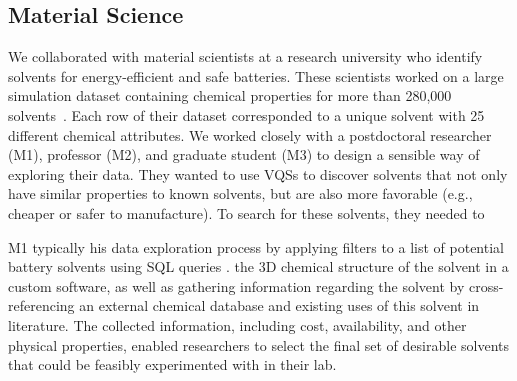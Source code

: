  \subsection{Material Science}
 \par\noindent{} 
 \npar We collaborated with material scientists at a research university who identify solvents for energy-efficient and safe batteries. These scientists worked on a large simulation dataset containing chemical properties for more than 280,000 solvents~\cite{Khetan2018}. Each row of their dataset corresponded to a unique solvent with 25 different chemical attributes. We worked closely with a postdoctoral researcher (M1), professor (M2), and graduate student (M3) to design a sensible way of exploring their data. They wanted to use VQSs to discover solvents that not only have similar properties to known solvents, but are also more favorable (e.g., cheaper or safer to manufacture). To search for these solvents, they needed to {\em{}}
 \par\noindent{} 
 \npar M1 typically  his data exploration process by applying filters to a list of potential battery solvents using SQL queries .  the 3D chemical structure of the solvent in a custom software, as well as gathering information regarding the solvent by cross-referencing an external chemical database and existing uses of this solvent in literature. The collected information, including cost, availability, and other physical properties, enabled researchers to select the final set of desirable solvents that could be feasibly experimented with in their lab.  %
